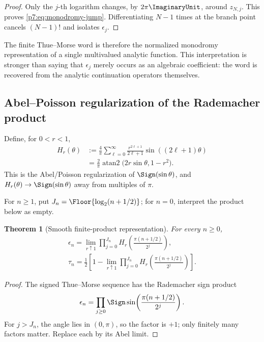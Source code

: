 \documentclass[11pt]{article}
\newtheorem{theorem}{Theorem}[section]
\theoremstyle{definition}
\theoremstyle{remark}
\begin{document}
\begin{proof}
Only the \(j\)-th logarithm changes, by \(2\pi\ImaginaryUnit\), around \(z_{N,j}\). This proves
\eqref{p7:eq:monodromy-jump}. Differentiating \(N-1\) times at the branch point cancels
\((N-1)!\) and isolates \(\epsilon_j\).
\end{proof}

The finite Thue--Morse word is therefore the normalized monodromy representation of a single
multivalued analytic function. This interpretation is stronger than saying that
\(\epsilon_j\) merely occurs as an algebraic coefficient: the word is recovered from the
analytic continuation operators themselves.

\subsection{Abel--Poisson regularization of the Rademacher product}

Define, for \(0<r<1\),
\begin{align}
 H_r(\theta)
 &:=\frac{4}{\pi}\sum_{\ell=0}^{\infty}
 \frac{r^{2\ell+1}}{2\ell+1}\sin((2\ell+1)\theta)
 \label{p7:eq:Hr-series}\\
 &=\frac{2}{\pi}\operatorname{atan2}
 \bigl(2r\sin\theta,1-r^2\bigr).
 \label{p7:eq:Hr-atan}
\end{align}
This is the Abel/Poisson regularization of \(\Sign(\sin\theta)\), and
\(H_r(\theta)\to\Sign(\sin\theta)\) away from multiples of \(\pi\).

For \(n\ge1\), put \(J_n=\Floor{\log_2(n+1/2)}\); for \(n=0\), interpret the product
below as empty.

\begin{theorem}[Smooth finite-product representation]
\label{p7:thm:Abel-TM}
For every \(n\ge0\),
\begin{align}
 \boxed{\displaystyle
 \epsilon_n=\lim_{r\uparrow1}
 \prod_{j=0}^{J_n}H_r\!\left(\frac{\pi(n+1/2)}{2^j}\right),}
 \label{p7:eq:epsilon-Abel}\\
 \boxed{\displaystyle
 \tau_n=\frac12\left[1-
 \lim_{r\uparrow1}\prod_{j=0}^{J_n}H_r\!\left(\frac{\pi(n+1/2)}{2^j}\right)\right].}
 \label{p7:eq:tau-Abel}
\end{align}
\end{theorem}

\begin{proof}
The signed Thue--Morse sequence has the Rademacher sign product
\[
 \epsilon_n=\prod_{j\ge0}\Sign\sin\!\left(\frac{\pi(n+1/2)}{2^j}\right).
\]
For \(j>J_n\), the angle lies in \((0,\pi)\), so the factor is \(+1\); only finitely many
factors matter. Replace each by its Abel limit.
\end{proof}
\end{document}
